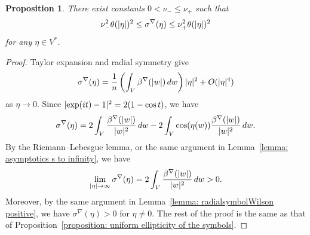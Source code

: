 \documentclass[a4paper,oneside,12pt]{amsart}
\theoremstyle{plain}
\newtheorem{proposition}[theorem]{Proposition}
\theoremstyle{definition}
\theoremstyle{remark}
\DeclarePairedDelimiter{\abs}{\lvert}{\rvert}
\newcommand{\cutoff}{\beta}
\newcommand{\cutoffnabla}{\cutoff^{\nabla}}
\newcommand{\symbolnabla}{\sigma^{\nabla}}
\begin{document}
\begin{proposition}\label{proposition: uniform estimates for nabla symbol}
  There exist constants $0 < \nu_- \le \nu_+$ such that
  \begin{equation}
    \nu_-^2 \theta(\abs{\eta})^2 \le \symbolnabla(\eta) \le \nu_+^2 \theta(\abs{\eta})^2
  \end{equation}
  for any $\eta \in V^*$.
\end{proposition}
\begin{proof}
  Taylor expansion and radial symmetry give
  \begin{equation}
    \symbolnabla(\eta) = \frac{1}{n} \left( \int_V \cutoffnabla(\abs{w}) \,dw \right) \abs{\eta}^2 + O(\abs{\eta}^4)
  \end{equation}
  as $\eta \to 0$.
  Since $\abs{\exp(it)-1}^2 = 2(1-\cos t)$, we have
  \begin{equation}
    \symbolnabla(\eta) = 2\int_V \frac{\cutoffnabla(\abs{w})}{\abs{w}^2} \,dw - 2\int_V \cos(\eta(w)) \frac{\cutoffnabla(\abs{w})}{\abs{w}^2} \,dw.
  \end{equation}
  By the Riemann--Lebesgue lemma, or the same argument in Lemma~\ref{lemma: asymptotics s to infinity}, we have
  \begin{equation}
    \lim_{\abs{\eta} \to \infty} \symbolnabla(\eta) = 2\int_V \frac{\cutoffnabla(\abs{w})}{\abs{w}^2} \,dw > 0.
  \end{equation}
  Moreover, by the same argument in Lemma~\ref{lemma: radialsymbolWilson positive}, we have $\symbolnabla(\eta) > 0$ for $\eta \ne 0$.
  The rest of the proof is the same as that of Proposition~\ref{proposition: uniform ellipticity of the symbols}.
\end{proof}
\end{document}
